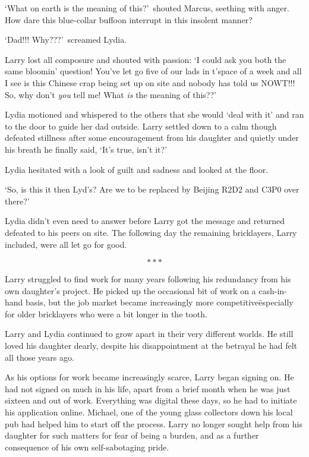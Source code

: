 `What on earth is the meaning of this?'~shouted Marcus, seething with
anger. How dare this blue-collar buffoon interrupt in this insolent
manner?

`Dad!!! Why???'~screamed Lydia.

Larry lost all composure and shouted with passion: `I could ask you
both the same bloomin' question! You've let go five of our lads in
t'space of a week and all I see is this Chinese crap being set up on
site and nobody has told us NOWT!!! So, why don't \textit{you} tell
me! What \textit{is} the meaning of this??' %

Lydia motioned and whispered to the others that she would `deal with
it' and ran to the door to guide her dad outside. Larry settled down
to a calm though defeated stillness after some encouragement from his
daughter and quietly under his breath he finally said, `It's true,
isn't it?'

Lydia hesitated with a look of guilt and sadness and looked at the
floor.

`So, is this it then Lyd's? Are we to be replaced by Beijing R2D2 and
C3P0 over there?'

Lydia didn't even need to answer before Larry got the message and
returned defeated to his peers on site. The following day the
remaining bricklayers, Larry included, were all let go for good.

\[***\]

Larry struggled to find work for many years following his redundancy
from his own daughter's project. He picked up the occasional bit of
work on a cash-in-hand basis, but the job market became increasingly
more competitive\=especially for older bricklayers who were a bit
longer in the tooth.

Larry and Lydia continued to grow apart in their very different
worlds. He still loved his daughter dearly, despite his disappointment
at the betrayal he had felt all those years ago.

As his options for work became increasingly scarce, Larry began
signing on. He had not signed on much in his life, apart from a brief
month when he was just sixteen and out of work. Everything was digital
these days, so he had to initiate his application online. Michael, one
of the young glass collectors down his local pub had helped him to
start off the process. Larry no longer sought help from his daughter
for such matters for fear of being a burden, and as a further
consequence of his own self-sabotaging pride.

